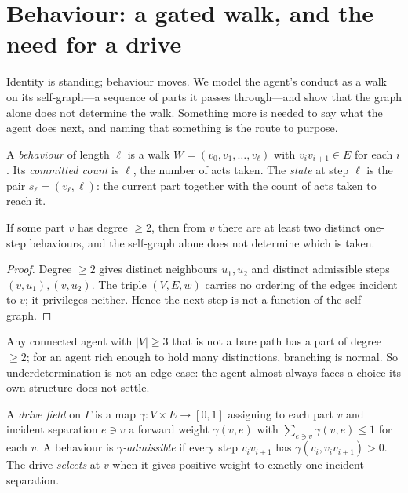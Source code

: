 \documentclass[11pt,twocolumn,a4paper]{article}
\newcommand{\Self}{\Gamma}          %
\newcommand{\V}{V}
\newcommand{\E}{E}
\newcommand{\wt}{w}
\newcommand{\drive}{\gamma}          %
\newcommand{\state}{s}
\newcommand{\abs}[1]{\lvert#1\rvert}
\begin{document}
\section{Behaviour: a gated walk, and the need for a drive}
\label{sec:behaviour}

Identity is standing; behaviour moves. We model the agent's conduct as a
walk on its self-graph---a sequence of parts it passes through---and show
that the graph alone does not determine the walk. Something more is
needed to say what the agent does next, and naming that something is the
route to purpose.

\begin{definition}
\label{def:walk}
A \emph{behaviour} of length $\ell$ is a walk $W=(v_0,v_1,\dots,v_\ell)$
with $v_iv_{i+1}\in\E$ for each $i$. Its \emph{committed count} is
$\ell$, the number of acts taken. The \emph{state} at step $\ell$ is the
pair $\state_\ell=(v_\ell,\ell)$: the current part together with the
count of acts taken to reach it.
\end{definition}

\begin{lemma}
\label{lem:branch}
If some part $v$ has degree $\ge2$, then from $v$ there are at least two
distinct one-step behaviours, and the self-graph alone does not determine
which is taken.
\end{lemma}

\begin{proof}
Degree $\ge2$ gives distinct neighbours $u_1,u_2$ and distinct admissible
steps $(v,u_1),(v,u_2)$. The triple $(\V,\E,\wt)$ carries no ordering of
the edges incident to $v$; it privileges neither. Hence the next step is
not a function of the self-graph.
\end{proof}

\begin{remark}
Any connected agent with $\abs{\V}\ge3$ that is not a bare path has a part
of degree $\ge2$; for an agent rich enough to hold many distinctions,
branching is normal. So underdetermination is not an edge case: the agent
almost always faces a choice its own structure does not settle.
\end{remark}

\begin{definition}
\label{def:drive}
A \emph{drive field} on $\Self$ is a map $\drive:\V\times\E\to[0,1]$
assigning to each part $v$ and incident separation $e\ni v$ a forward
weight $\drive(v,e)$ with $\sum_{e\ni v}\drive(v,e)\le1$ for each $v$. A
behaviour is \emph{$\drive$-admissible} if every step $v_iv_{i+1}$ has
$\drive(v_i,v_iv_{i+1})>0$. The drive \emph{selects} at $v$ when it gives
positive weight to exactly one incident separation.
\end{definition}
\end{document}

